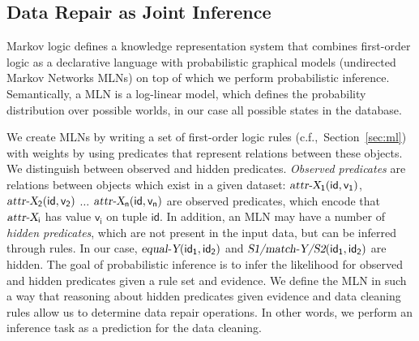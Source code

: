 \subsection{Data Repair as Joint Inference}
\label{subsec:jointinference}
Markov logic defines a knowledge representation system that combines first-order logic as a declarative language with probabilistic graphical models (undirected Markov Networks MLNs) on top of which we perform probabilistic inference. Semantically, a MLN is a log-linear model, which defines the probability distribution over possible worlds, in our case all possible states in the database.

We create MLNs by writing a set of first-order logic rules (c.f.,~Section~\ref{sec:ml}) with weights by using predicates that represent relations between these objects. We distinguish between observed and hidden predicates. \textit{Observed predicates} are relations between objects which exist in a given dataset: $\mathsf{\textsl{attr-X}_1(id,v_1)}$, $\mathsf{\textsl{attr-X}_2(id,v_2)}$ $\dots$ $\mathsf{\textsl{attr-X}_n(id,v_n)}$ are observed predicates, which encode that $\mathsf{\textsl{attr-X}_i}$ has value $\mathsf{v_i}$ on tuple $\mathsf{id}$. In addition, an MLN may have a number of \textit{hidden predicates}, which are not present in the input data, but can be inferred through rules. In our case, $\mathsf{\textsl{equal-Y}(id_1, id_2)}$ and $\mathsf{\textsl{S1/match-Y/S2}(id_1, id_2)}$ are hidden.  The goal of probabilistic inference is to infer the likelihood for observed and hidden predicates given a rule set and evidence. We define the MLN in such a way that reasoning about hidden predicates given evidence and data cleaning rules allow us to determine data repair operations. In other words, we perform an inference task as a prediction for the data cleaning.

